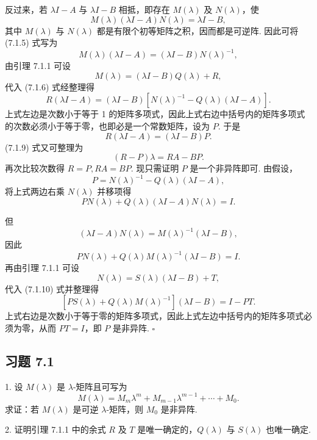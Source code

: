 \documentclass[UTF8,12pt,a4paper,fontset=fandol]{ctexart}
\begin{document}
反过来，若 $\lambda I-A$ 与 $\lambda I-B$ 相抵，即存在 $M(\lambda)$ 及 $N(\lambda)$，使
\begin{equation}
M(\lambda)(\lambda I-A)N(\lambda)=\lambda I-B,
\tag{7.1.5}
\end{equation}
其中 $M(\lambda)$ 与 $N(\lambda)$ 都是有限个初等矩阵之积，因而都是可逆阵. 因此可将 (7.1.5) 式写为
\begin{equation}
M(\lambda)(\lambda I-A)=(\lambda I-B)N(\lambda)^{-1},
\tag{7.1.6}
\end{equation}
由引理 7.1.1 可设
\begin{equation}
M(\lambda)=(\lambda I-B)Q(\lambda)+R,
\tag{7.1.7}
\end{equation}
代入 (7.1.6) 式经整理得
\begin{equation}
R(\lambda I-A)=(\lambda I-B)\left[N(\lambda)^{-1}-Q(\lambda)(\lambda I-A)\right].
\tag{7.1.8}
\end{equation}
上式左边是次数小于等于 1 的矩阵多项式，因此上式右边中括号内的矩阵多项式的次数必须小于等于零，也即必是一个常数矩阵，设为 $P$. 于是
\begin{equation}
R(\lambda I-A)=(\lambda I-B)P.
\tag{7.1.9}
\end{equation}
(7.1.9) 式又可整理为
\[
(R-P)\lambda=RA-BP.
\]
再次比较次数得 $R=P,RA=BP$. 现只需证明 $P$ 是一个非异阵即可. 由假设，
\[
P=N(\lambda)^{-1}-Q(\lambda)(\lambda I-A),
\]
将上式两边右乘 $N(\lambda)$ 并移项得
\[
PN(\lambda)+Q(\lambda)(\lambda I-A)N(\lambda)=I.
\]

但
\[
(\lambda I-A)N(\lambda)=M(\lambda)^{-1}(\lambda I-B),
\]
因此
\begin{equation}
PN(\lambda)+Q(\lambda)M(\lambda)^{-1}(\lambda I-B)=I.
\tag{7.1.10}
\end{equation}
再由引理 7.1.1 可设
\[
N(\lambda)=S(\lambda)(\lambda I-B)+T,
\]
代入 (7.1.10) 式并整理得
\[
\left[PS(\lambda)+Q(\lambda)M(\lambda)^{-1}\right](\lambda I-B)=I-PT.
\]
上式右边是次数小于等于零的矩阵多项式，因此上式左边中括号内的矩阵多项式必须为零，从而 $PT=I$，即 $P$ 是非异阵. $\square$

\subsection*{习题 7.1}

1. 设 $M(\lambda)$ 是 $\lambda$-矩阵且可写为
\[
M(\lambda)=M_m\lambda^m+M_{m-1}\lambda^{m-1}+\cdots+M_0.
\]
求证：若 $M(\lambda)$ 是可逆 $\lambda$-矩阵，则 $M_0$ 是非异阵.

2. 证明引理 7.1.1 中的余式 $R$ 及 $T$ 是唯一确定的，$Q(\lambda)$ 与 $S(\lambda)$ 也唯一确定.
\end{document}
